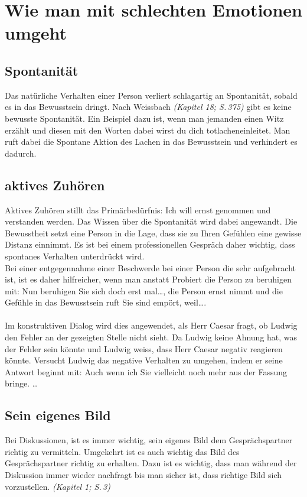 \section*{Wie man mit schlechten Emotionen umgeht}
\subsection*{Spontanität}
Das natürliche Verhalten einer Person verliert schlagartig an Spontanität, sobald es in das Bewusstsein dringt. Nach Weissbach \textit{(Kapitel 18; S.\,375)} gibt es keine bewusste Spontanität. Ein Beispiel dazu ist, wenn man jemanden einen Witz erzählt und diesen mit den Worten \glqq dabei wirst du dich totlachen\grqq\text{ }einleitet. Man ruft dabei die Spontane Aktion des Lachen in das Bewusstsein und verhindert es dadurch. %
\subsection*{aktives Zuhören}
Aktives Zuhören stillt das Primärbedürfnis: Ich will ernst genommen und verstanden werden. Das Wissen über die Spontanität wird dabei angewandt. Die Bewusstheit setzt eine Person in die Lage, dass sie zu Ihren Gefühlen eine gewisse Distanz einnimmt. Es ist bei einem professionellen Gespräch daher wichtig, dass spontanes Verhalten unterdrückt wird.\\
Bei einer entgegennahme einer Beschwerde bei einer Person die sehr aufgebracht ist, ist es daher hilfreicher, wenn man anstatt Probiert die Person zu beruhigen mit: \glqq Nun beruhigen Sie sich doch erst mal\dots\grqq, die Person ernst nimmt und die Gefühle in das Bewusstsein ruft \glqq Sie sind empört, weil\dots\grqq.\\
\\
Im konstruktiven Dialog wird dies angewendet, als Herr Caesar fragt, ob Ludwig den
Fehler an der gezeigten Stelle nicht sieht.  Da Ludwig keine Ahnung
hat, was der Fehler sein könnte und Ludwig weiss, dass Herr Caesar
negativ reagieren könnte.  Versucht Ludwig das negative Verhalten zu
umgehen, indem er seine Antwort beginnt mit:  \glqq Auch wenn ich Sie
vielleicht noch mehr aus der Fassung bringe. \dots\grqq
\subsection*{Sein eigenes Bild}
Bei Diskussionen, ist es immer wichtig, sein eigenes Bild dem
Gesprächspartner richtig zu vermitteln.  Umgekehrt ist es auch wichtig
das Bild des Gesprächspartner richtig zu erhalten.  Dazu ist es
wichtig, dass man während der Diskussion immer wieder nachfragt bis
man sicher ist, dass richtige Bild sich vorzustellen. \textit{(Kapitel
1; S.\,3)}

